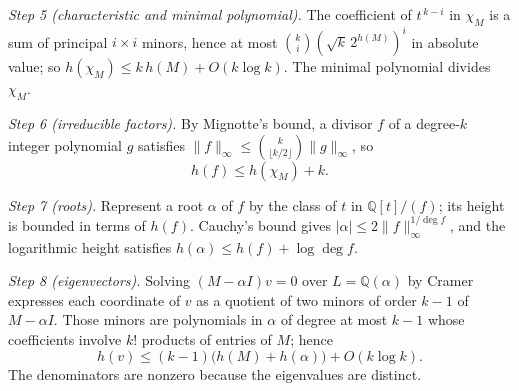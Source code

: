 \documentclass[journal]{IEEEtran}
\theoremstyle{plainn}
\theoremstyle{remark}
\begin{document}
\emph{Step 5 (characteristic and minimal polynomial).} The coefficient of $t^{\,k-i}$ in $\chi_M$ is
a sum of principal $i\times i$ minors, hence at most $\binom{k}{i}(\sqrt{k}\,2^{h(M)})^{i}$ in
absolute value; so $h(\chi_M)\le k\,h(M)+O(k\log k)$. The minimal polynomial divides $\chi_M$.

\emph{Step 6 (irreducible factors).} By Mignotte's bound, a divisor $f$ of a degree-$k$ integer
polynomial $g$ satisfies $\|f\|_\infty\le\binom{k}{\lfloor k/2\rfloor}\|g\|_\infty$, so
\[
h(f)\le h(\chi_M)+k .
\]

\emph{Step 7 (roots).} Represent a root $\alpha$ of $f$ by the class of $t$ in
$\mathbb Q[t]/(f)$; its height is bounded in terms of $h(f)$. Cauchy's bound gives
$|\alpha|\le2\|f\|_\infty^{1/\deg f}$, and the logarithmic height satisfies
$h(\alpha)\le h(f)+\log\deg f$.

\emph{Step 8 (eigenvectors).} Solving $(M-\alpha I)v=0$ over $L=\mathbb Q(\alpha)$ by Cramer
expresses each coordinate of $v$ as a quotient of two minors of order $k-1$ of $M-\alpha I$. Those
minors are polynomials in $\alpha$ of degree at most $k-1$ whose coefficients involve $k!$ products
of entries of $M$; hence
\[
h(v)\le (k-1)\bigl(h(M)+h(\alpha)\bigr)+O(k\log k).
\]
The denominators are nonzero because the eigenvalues are distinct.
\end{document}
